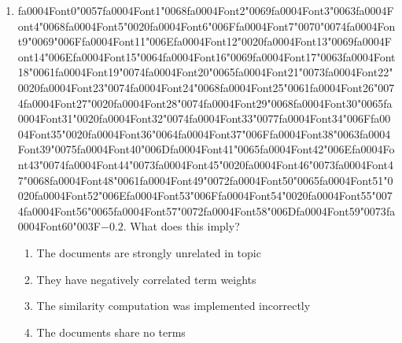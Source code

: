 \documentclass[12pt]{article}
\begin{document}
\begin{enumerate}[label=Q\arabic*.]
 \item {\csname fa0004Font0\endcsname\char"0057}{\csname fa0004Font1\endcsname\char"0068}{\csname fa0004Font2\endcsname\char"0069}{\csname fa0004Font3\endcsname\char"0063}{\csname fa0004Font4\endcsname\char"0068}{\csname fa0004Font5\endcsname\char"0020}{\csname fa0004Font6\endcsname\char"006F}{\csname fa0004Font7\endcsname\char"0070}{\char"0074}{\csname fa0004Font9\endcsname\char"0069}{\char"006F}{\csname fa0004Font11\endcsname\char"006E}{\csname fa0004Font12\endcsname\char"0020}{\csname fa0004Font13\endcsname\char"0069}{\csname fa0004Font14\endcsname\char"006E}{\csname fa0004Font15\endcsname\char"0064}{\csname fa0004Font16\endcsname\char"0069}{\csname fa0004Font17\endcsname\char"0063}{\csname fa0004Font18\endcsname\char"0061}{\csname fa0004Font19\endcsname\char"0074}{\csname fa0004Font20\endcsname\char"0065}{\csname fa0004Font21\endcsname\char"0073}{\csname fa0004Font22\endcsname\char"0020}{\csname fa0004Font23\endcsname\char"0074}{\csname fa0004Font24\endcsname\char"0068}{\csname fa0004Font25\endcsname\char"0061}{\csname fa0004Font26\endcsname\char"0074}{\csname fa0004Font27\endcsname\char"0020}{\csname fa0004Font28\endcsname\char"0074}{\csname fa0004Font29\endcsname\char"0068}{\csname fa0004Font30\endcsname\char"0065}{\csname fa0004Font31\endcsname\char"0020}{\csname fa0004Font32\endcsname\char"0074}{\csname fa0004Font33\endcsname\char"0077}{\csname fa0004Font34\endcsname\char"006F}{\csname fa0004Font35\endcsname\char"0020}{\csname fa0004Font36\endcsname\char"0064}{\csname fa0004Font37\endcsname\char"006F}{\csname fa0004Font38\endcsname\char"0063}{\csname fa0004Font39\endcsname\char"0075}{\csname fa0004Font40\endcsname\char"006D}{\csname fa0004Font41\endcsname\char"0065}{\csname fa0004Font42\endcsname\char"006E}{\csname fa0004Font43\endcsname\char"0074}{\csname fa0004Font44\endcsname\char"0073}{\csname fa0004Font45\endcsname\char"0020}{\csname fa0004Font46\endcsname\char"0073}{\csname fa0004Font47\endcsname\char"0068}{\csname fa0004Font48\endcsname\char"0061}{\csname fa0004Font49\endcsname\char"0072}{\csname fa0004Font50\endcsname\char"0065}{\csname fa0004Font51\endcsname\char"0020}{\csname fa0004Font52\endcsname\char"006E}{\csname fa0004Font53\endcsname\char"006F}{\csname fa0004Font54\endcsname\char"0020}{\csname fa0004Font55\endcsname\char"0074}{\csname fa0004Font56\endcsname\char"0065}{\csname fa0004Font57\endcsname\char"0072}{\csname fa0004Font58\endcsname\char"006D}{\csname fa0004Font59\endcsname\char"0073}{\csname fa0004Font60\endcsname\char"003F}$-0.2$. What does this imply?
 \begin{enumerate}[label=(\Alph*)]
     \item The documents are strongly unrelated in topic
     \item They have negatively correlated term weights
     \item The similarity computation was implemented incorrectly
     \item The documents share no terms
 \end{enumerate}
 

\end{enumerate}
\end{document}
